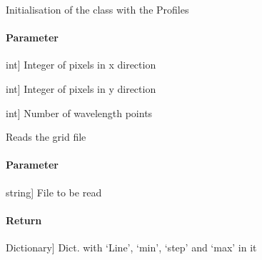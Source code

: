 \documentclass[letterpaper,10pt,english]{sphinxmanual}
\begin{document}
\begin{fulllineitems}
\begin{fulllineitems}
\label{\detokenize{classes:profile_stk.Profile.__init__}}
\pysigstartsignatures
{}
\pysigstopsignatures
\sphinxAtStartPar
Initialisation of the class with the Profiles


\paragraph{Parameter}
\label{\detokenize{classes:id30}}\begin{description}
\sphinxlineitem{nx}{[}int{]}
\sphinxAtStartPar
Integer of pixels in x direction

\sphinxlineitem{ny}{[}int{]}
\sphinxAtStartPar
Integer of pixels in y direction

\sphinxlineitem{nw}{[}int{]}
\sphinxAtStartPar
Number of wavelength points

\end{description}

\end{fulllineitems}


\begin{fulllineitems}
\label{\detokenize{classes:profile_stk.Profile.__read_grid}}
\pysigstartsignatures
{}
\pysigstopsignatures
\sphinxAtStartPar
Reads the grid file


\paragraph{Parameter}
\label{\detokenize{classes:id31}}\begin{description}
\sphinxlineitem{filename}{[}string{]}
\sphinxAtStartPar
File to be read

\end{description}


\paragraph{Return}
\label{\detokenize{classes:id32}}\begin{description}
\sphinxlineitem{dict}{[}Dictionary{]}
\sphinxAtStartPar
Dict. with ‘Line’, ‘min’, ‘step’ and ‘max’ in it


\end{description}
\end{fulllineitems}
\end{fulllineitems}
\end{document}
